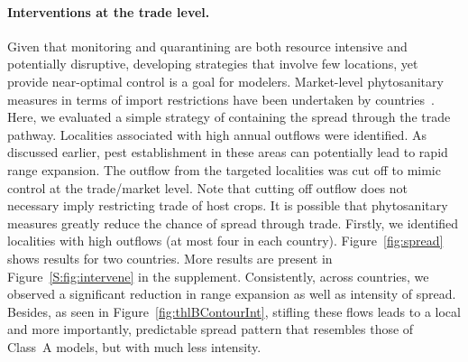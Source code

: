 \documentclass[11pt]{article}
\theoremstyle{definition}
\begin{document}
\paragraph{Interventions at the trade level.}
Given that monitoring and quarantining are both resource intensive and
potentially disruptive, developing strategies that involve few locations,
yet provide near-optimal control is a goal for modelers. 
Market-level phytosanitary measures in terms of import restrictions have
been undertaken by countries~\cite{USDA2012}. Here, we evaluated a simple
strategy of containing the spread through the trade pathway. Localities
associated with high annual outflows were identified. As discussed earlier,
pest establishment in these areas can potentially lead to rapid range
expansion. The outflow from the targeted localities was cut off to mimic
control at the trade/market level. Note that cutting off outflow does not
necessary imply restricting trade of host crops. It is possible that
phytosanitary measures greatly reduce the chance of spread through trade.
Firstly, we identified localities with high outflows (at most four in each
country).  Figure~\ref{fig:spread} shows results for two countries. More
results are present in Figure~\ref{S:fig:intervene} in the supplement.
Consistently, across countries, we observed a significant reduction in
range expansion as well as intensity of spread.  Besides, as seen in
Figure~\ref{fig:thlBContourInt}, stifling these flows leads to a local and
more importantly, predictable spread pattern that resembles those of
Class~A models, but with much less intensity. 
\end{document}
